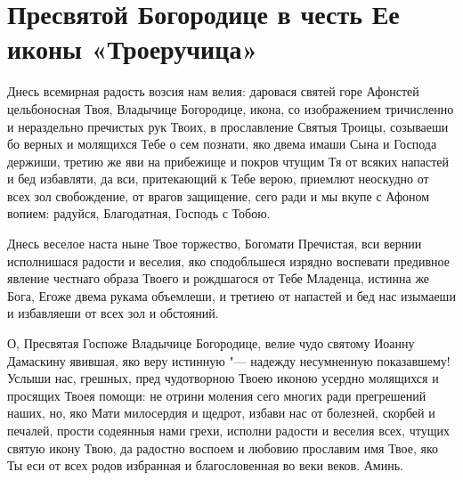 \section{Пресвятой Богородице в честь Ее иконы «Троеручица»}\begin{mymulticols}


Днесь всемирная радость возсия нам велия: даровася святей горе Афонстей цельбоносная Твоя, Владычице Богородице, икона, со изображением тричисленно и нераздельно пречистых рук Твоих, в прославление Святыя Троицы, созываеши бо верных и молящихся Тебе о сем познати, яко двема имаши Сына и Господа держиши, третию же яви на прибежище и покров чтущим Тя от всяких напастей и бед избавляти, да вси, притекающий к Тебе верою, приемлют неоскудно от всех зол свобождение, от врагов защищение, сего ради и мы вкупе с Афоном вопием: радуйся, Благодатная, Господь с Тобою. 


Днесь веселое наста ныне Твое торжество, Богомати Пречистая, вси вернии исполнишася радости и веселия, яко сподобльшеся изрядно воспевати предивное явление честнаго образа Твоего и рождшагося от Тебе Младенца, истинна же Бога, Егоже двема рукама объемлеши, и третиею от напастей и бед нас изымаеши и избавляеши от всех зол и обстояний.


О, Пресвятая Госпоже Владычице Богородице, велие чудо святому Иоанну Дамаскину явившая, яко веру истинную "--- надежду несумненную показавшему! Услыши нас, грешных, пред чудотворною Твоею иконою усердно молящихся и просящих Твоея помощи: не отрини моления сего многих ради прегрешений наших, но, яко Мати милосердия и щедрот, избави нас от болезней, скорбей и печалей, прости содеянныя нами грехи, исполни радости и веселия всех, чтущих святую икону Твою, да радостно воспоем и любовию прославим имя Твое, яко Ты еси от всех родов избранная и благословенная во веки веков. Аминь.

\end{mymulticols}

\mychapterending


